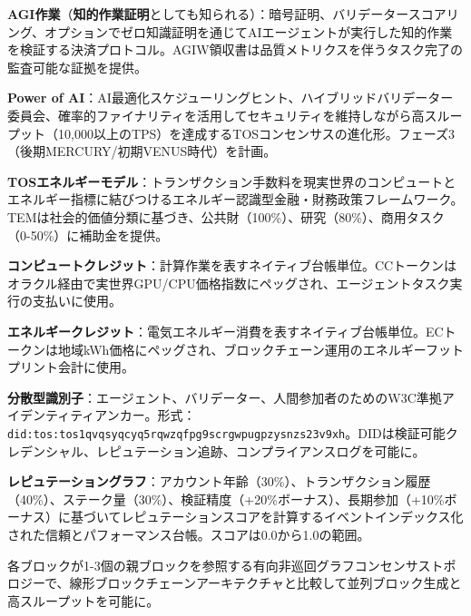 \documentclass[11pt]{article}
\begin{document}
\begin{description}[leftmargin=3cm, style=nextline]
  \item[AGIW (PoIW)] \textbf{AGI作業}（\textbf{知的作業証明}としても知られる）：暗号証明、バリデータースコアリング、オプションでゼロ知識証明を通じてAIエージェントが実行した知的作業を検証する決済プロトコル。AGIW領収書は品質メトリクスを伴うタスク完了の監査可能な証拠を提供。

  \item[PAI] \textbf{Power of AI}：AI最適化スケジューリングヒント、ハイブリッドバリデーター委員会、確率的ファイナリティを活用してセキュリティを維持しながら高スループット（10,000以上のTPS）を達成するTOSコンセンサスの進化形。フェーズ3（後期MERCURY/初期VENUS時代）を計画。

  \item[TEM] \textbf{TOSエネルギーモデル}：トランザクション手数料を現実世界のコンピュートとエネルギー指標に結びつけるエネルギー認識型金融・財務政策フレームワーク。TEMは社会的価値分類に基づき、公共財（100\%）、研究（80\%）、商用タスク（0-50\%）に補助金を提供。

  \item[CC] \textbf{コンピュートクレジット}：計算作業を表すネイティブ台帳単位。CCトークンはオラクル経由で実世界GPU/CPU価格指数にペッグされ、エージェントタスク実行の支払いに使用。

  \item[EC] \textbf{エネルギークレジット}：電気エネルギー消費を表すネイティブ台帳単位。ECトークンは地域kWh価格にペッグされ、ブロックチェーン運用のエネルギーフットプリント会計に使用。

  \item[DID] \textbf{分散型識別子}：エージェント、バリデーター、人間参加者のためのW3C準拠アイデンティティアンカー。形式：\texttt{did:tos:tos1qvqsyqcyq5rqwzqfpg9scrgwpugpzysnzs23v9xh}。DIDは検証可能クレデンシャル、レピュテーション追跡、コンプライアンスログを可能に。

  \item[RepGraph] \textbf{レピュテーショングラフ}：アカウント年齢（30\%）、トランザクション履歴（40\%）、ステーク量（30\%）、検証精度（+20\%ボーナス）、長期参加（+10\%ボーナス）に基づいてレピュテーションスコアを計算するイベントインデックス化された信頼とパフォーマンス台帳。スコアは0.0から1.0の範囲。

  \item[BlockDAG] 各ブロックが1-3個の親ブロックを参照する有向非巡回グラフコンセンサストポロジーで、線形ブロックチェーンアーキテクチャと比較して並列ブロック生成と高スループットを可能に。


\end{description}
\end{document}
